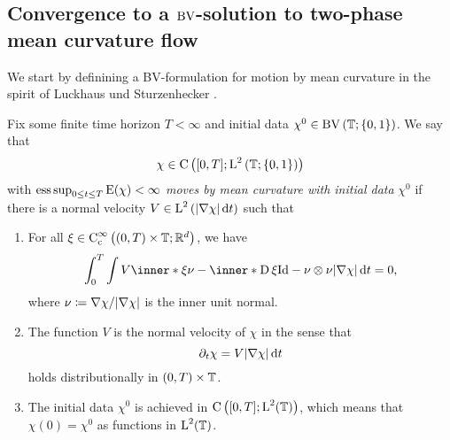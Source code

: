 \subsection{Convergence to a $\operatorname{BV}$-solution to two-phase mean curvature flow}

We start by definining a BV-formulation for motion by mean curvature in the 
spirit of Luckhaus und Sturzenhecker 
\cite{luckhaus_sturzenhecker_implicit_time_discretization_for_mcf}.

\begin{definition}
	\label{motion_by_mcv}
	Fix some finite time horizon $ T < \infty $ and initial data $ \chi^{ 0 
	}\in \operatorname{BV} \left( \operatorname{\mathbb{T}} ; \{ 0 , 1 \} \right) $. We say that 
	\begin{equation*}
		\chi \in 
		\operatorname{C} \left(
		[ 0 , T ] ; \operatorname{L}^{ 2 } \left( \operatorname{\mathbb{T}} ; \{ 0 , 1 \}  \right)
		\right)
	\end{equation*}
	with $ \operatorname*{ess\,sup}_{ 0 \leq t \leq T } \operatorname{E} ( \chi ) < \infty $ \emph{moves 
	by mean 
	curvature with initial data } $ \chi^{ 0 } $ if there is a normal velocity
	$ V \in \operatorname{L}^{ 2 } \left( \abs{ \nabla \chi } \dd{ t } \right) $ such that 
	\begin{enumerate}
		\item 
		For all 
		$ \xi \in \operatorname{C}_{ \mathrm{ c } }^{ \infty } \left( ( 0 , T ) \times 
		\operatorname{\mathbb{T}} ; \mathbb{ R }^{ d } \right) $,
		we have
		\begin{equation}
			\label{integral_formulation_of_mcf}
			\int_{ 0 }^{ T }
			\int
			V \inner*{ \xi }{ \nu }
			- 
			\inner*{ \diff \xi }{ \mathrm{ Id } - \nu \otimes \nu }
			\abs{ \nabla \chi }
			\dd{ t }
			=
			0,
		\end{equation}
		where $ \nu \coloneqq \nabla \chi / \abs{ \nabla \chi } $ is the inner 
		unit normal.
		\item 
		The function $ V $ is the normal velocity of $ \chi $ in the sense that 
		\begin{equation*}
			\partial_{ t } \chi
			=
			V
			\abs{ \nabla \chi }
			\dd{ t }
		\end{equation*}
		holds distributionally in $ ( 0 , T ) \times \operatorname{\mathbb{T}} $.
		\item 
		The initial data $ \chi^{ 0 } $ is achieved in $ \operatorname{C} \left( [ 0 , T ] 
		; \operatorname{L}^{  2 } ( \operatorname{\mathbb{T}} ) \right) $, which means that $ \chi ( 
		0 ) = \chi^{ 0 } $ as functions in $ \operatorname{L}^{ 2 } ( \operatorname{\mathbb{T}} ) $.
	\end{enumerate}
\end{definition}

